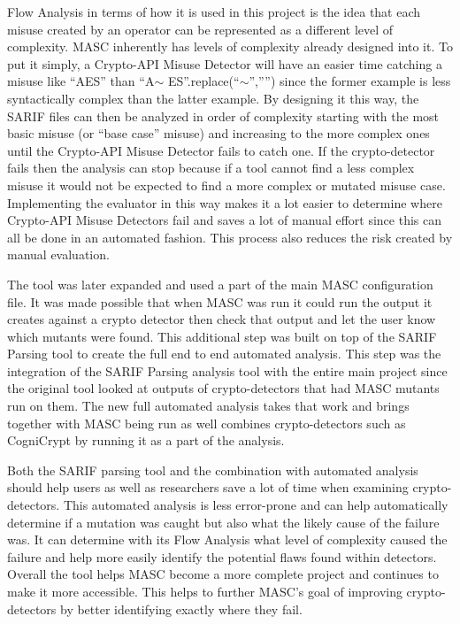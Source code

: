 Flow Analysis in terms of how it is used in this project is the idea that each misuse created by an operator can be represented as a different level of complexity.  MASC inherently has levels of complexity already designed into it. To put it simply, a Crypto-API Misuse Detector will have an easier time catching a misuse like “AES” than “A$\sim$ ES”.replace(“$\sim$”,””) since the former example is less syntactically complex than the latter example. By designing it this way, the SARIF files can then be analyzed in order of complexity starting with the most basic misuse (or “base case” misuse) and increasing to the more complex ones until the Crypto-API Misuse Detector fails to catch one. If the crypto-detector fails then the analysis can stop because if a tool cannot find a less complex misuse it would not be expected to find a more complex or mutated misuse case.  Implementing the evaluator in this way makes it a lot easier to determine where Crypto-API Misuse Detectors fail and saves a lot of manual effort since this can all be done in an automated fashion.  This process also reduces the risk created by manual evaluation. 

The tool was later expanded and used a part of the main MASC configuration file. It was made possible that when MASC was run it could run the output it creates against a crypto detector then check that output and let the user know which mutants were found. This additional step was built on top of the SARIF Parsing tool to create the full end to end automated analysis. This step was the integration of the SARIF Parsing analysis tool with the entire main project since the original tool looked at outputs of crypto-detectors that had MASC mutants run on them. The new full automated analysis takes that work and brings together with MASC being run as well combines crypto-detectors such as CogniCrypt by running it as a part of the analysis.

Both the SARIF parsing tool and the combination with automated analysis should help users as well as researchers save a lot of time when examining crypto-detectors. This automated analysis is less error-prone and can help automatically determine if a mutation was caught but also what the likely cause of the failure was. It can determine with its Flow Analysis what level of complexity caused the failure and help more easily identify the potential flaws found within detectors. Overall the tool helps MASC become a more complete project and continues to make it more accessible. This helps to further MASC’s goal of improving crypto-detectors by better identifying exactly where they fail. 

